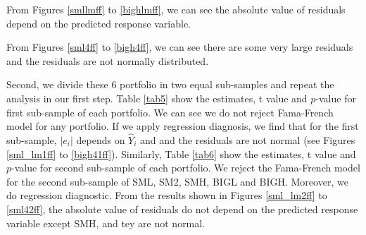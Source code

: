 \documentclass[11pt]{article}
\begin{document}
From Figures \ref{smllmff} to \ref{bighlmff}, we can see the absolute value of residuals depend on the predicted response variable. 

From Figures \ref{sml4ff} to \ref{bigh4ff}, we can see there are some very large residuals and the residuals are not normally distributed.

Second, we divide these 6 portfolio in two equal sub-samples and repeat the analysis in our first step. Table \ref{tab5} show the  estimates, t value and $p$-value for first sub-sample of each portfolio. We can see we do not reject Fama-French model for any portfolio. If we apply regression diagnosis, we find that for the first sub-sample, $|e_i|$ depends on $\hat{Y}_i$ and and the residuals are not normal (see Figures \ref{sml_lm1ff} to \ref{bigh41ff}). Similarly, Table \ref{tab6} show the estimates, t value and $p$-value for second sub-sample of each portfolio. We reject the Fama-French model for the second sub-sample of SML, SM2, SMH, BIGL and BIGH. Moreover, we do regression diagnostic. From the results shown in Figures \ref{sml_lm2ff} to \ref{sml42ff}, the absolute value of residuals do not depend on the predicted response variable except SMH, and tey are not normal.
\end{document}
